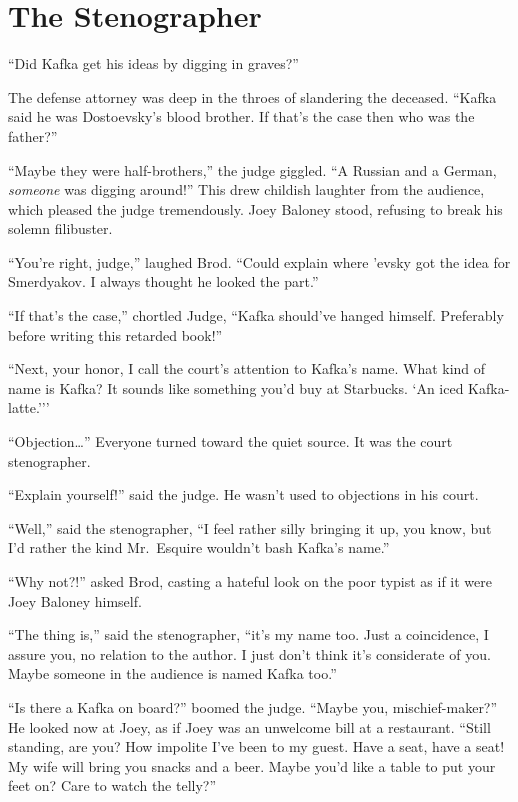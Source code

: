 \documentclass[oneside]{book}
\begin{document}
\chapter{The Stenographer}

``Did Kafka get his ideas by digging in graves?''

The defense attorney was deep in the throes of slandering the
deceased.  ``Kafka said he was Dostoevsky's blood brother.
If that's the case then who was the father?''

``Maybe they were half-brothers,'' the judge giggled.  ``A Russian and a German,
\emph{someone} was digging around!''  This drew childish laughter from the
audience, which pleased the judge tremendously.  Joey Baloney stood, refusing to
break his solemn filibuster.

``You're right, judge,'' laughed Brod.  ``Could explain where 'evsky got the idea for
Smerdyakov.  I always thought he looked the part.''

``If that's the case,'' chortled Judge, ``Kafka should've hanged himself.  Preferably
before writing this retarded book!''

``Next, your honor, I call the court's attention to Kafka's name.
What kind of name is Kafka?  It sounds like
something you'd buy at Starbucks.  `An iced
Kafka-latte.{'}''

``Objection\ldots''  Everyone turned toward the quiet source.
It was the court stenographer.

``Explain yourself!'' said the judge.  He wasn't used to objections in his court.

``Well,'' said the stenographer, ``I feel rather silly bringing it up, you know,
but I'd rather the kind Mr.~Esquire wouldn't bash Kafka's name.''

``Why not?!'' asked Brod, casting a hateful look on the poor typist as if it were Joey Baloney
himself.

``The thing is,'' said the stenographer, ``it's my name too.  Just a coincidence,
I assure you, no relation to the author.  I just don't think it's considerate
of you.  Maybe someone in the audience is named Kafka too.''

``Is there a Kafka on board?'' boomed the judge.
``Maybe you, mischief-maker?'' He looked now at Joey, as if Joey was an unwelcome bill at a restaurant.
``Still standing, are you?  How impolite I've been to my guest.  Have a seat, have a seat!  My wife will bring you snacks and
a beer.  Maybe you'd like a table to put your feet on?  Care to watch the telly?''
\end{document}
